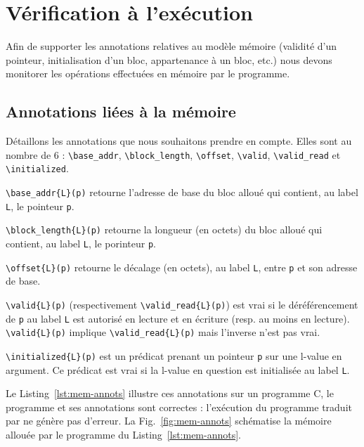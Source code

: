 
\chapter{Vérification à l'exécution}
\label{sec:runtime}

\chapterintro

Afin de supporter les annotations relatives au modèle mémoire (validité d'un
pointeur, initialisation d'un bloc, appartenance à un bloc, etc.) nous devons
monitorer les opérations effectuées en mémoire par le programme.



\section{Annotations \eacsl liées à la mémoire}


Détaillons les annotations \acsl que nous souhaitons prendre en compte.
Elles sont au nombre de 6 : \lstinline{\base_addr}, \lstinline{\block_length},
\lstinline{\offset}, \lstinline{\valid}, \lstinline{\valid_read} et
\lstinline{\initialized}.







\lstinline'\base_addr{L}(p)' retourne l'adresse de base du bloc alloué
qui contient, au label \lstinline{L}, le pointeur \lstinline{p}.

\lstinline'\block_length{L}(p)' retourne la longueur (en octets) du
bloc alloué qui contient, au label \lstinline{L}, le porinteur \lstinline{p}.

\lstinline'\offset{L}(p)' retourne le décalage (en octets), au label
\lstinline{L}, entre \lstinline{p} et son adresse de base.

\lstinline'\valid{L}(p)' (respectivement \lstinline'\valid_read{L}(p)') est vrai
si le déréférencement de \lstinline{p} au label \lstinline{L} est autorisé en
lecture et en écriture (resp. au moins en lecture).
\lstinline'\valid{L}(p)' implique \lstinline'\valid_read{L}(p)'
mais l'inverse n'est pas vrai.

\lstinline'\initialized{L}(p)' est un prédicat prenant un pointeur \lstinline{p}
sur une l-value en argument. Ce prédicat est vrai si la l-value en question est
initialisée au label \lstinline{L}.

Le Listing~\ref{lst:mem-annots} illustre ces annotations sur un programme C, le
programme et ses annotations sont correctes : l'exécution du programme traduit
par \eacsltoc ne génère pas d'erreur.
La Fig.~\ref{fig:mem-annots} schématise la mémoire allouée par le programme du
Listing~\ref{lst:mem-annots}.


